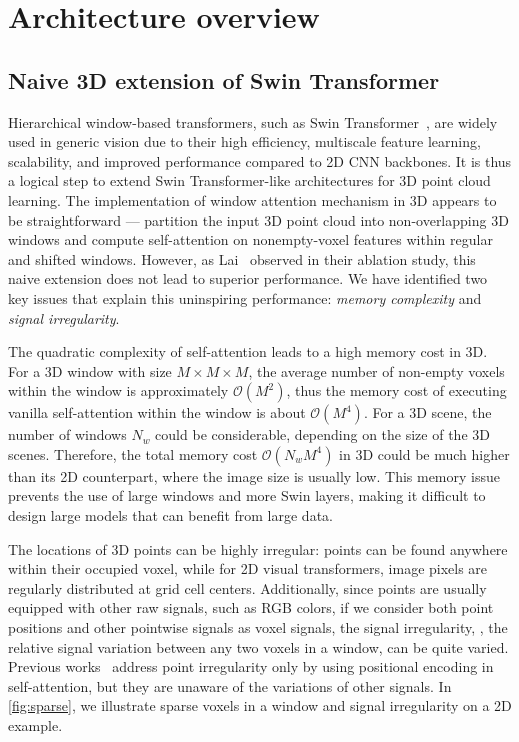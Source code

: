 \documentclass[10pt,twocolumn,letterpaper]{article}
\begin{document}
\section{Architecture overview}

\subsection{Naive 3D extension of Swin Transformer}
Hierarchical window-based transformers, such as Swin Transformer~\cite{liu2021swin}, are widely used in generic vision due to their high efficiency, multiscale feature learning, scalability, and improved performance compared to 2D CNN backbones. It is thus a logical step to extend Swin Transformer-like architectures for 3D point cloud learning. The implementation of window attention mechanism in 3D appears to be straightforward --- partition the input 3D point cloud into non-overlapping 3D windows and compute self-attention on nonempty-voxel features within regular and shifted windows. However, as Lai~\etal {} observed in their ablation study, this naive extension does not lead to superior performance. We have identified two key issues that explain this uninspiring performance: \emph{memory complexity} and \emph{signal irregularity}.

 The quadratic complexity of self-attention leads to a high memory cost in 3D. For a 3D window with size $M\times M \times M$, the average number of non-empty voxels within the window is approximately $\mathcal{O}(M^2)$, thus the memory cost of executing vanilla self-attention within the window is about $\mathcal{O}(M^4)$. For a 3D scene, the number of windows $N_w$ could be considerable, depending on the size of the 3D scenes. Therefore, the total memory cost $\mathcal{O}(N_wM^4)$ in 3D could be much higher than its 2D counterpart, where the image size is usually low. This memory issue prevents the use of large windows and more Swin layers, making it difficult to design large models that can benefit from large data. 

 The locations of 3D points can be highly irregular: points can be found anywhere within their occupied voxel, while for 2D visual transformers, image pixels are regularly distributed at grid cell centers. Additionally, since points are usually equipped with other raw signals, such as RGB colors, if we consider both point positions and other pointwise signals as voxel signals, the signal irregularity, \ie, the relative signal variation between any two voxels in a window, can be quite varied. Previous works~ address point irregularity only by using positional encoding in self-attention, but they are unaware of the variations of other signals. In \cref{fig:sparse}, we illustrate sparse voxels in a window and signal irregularity on a 2D example.
\end{document}
